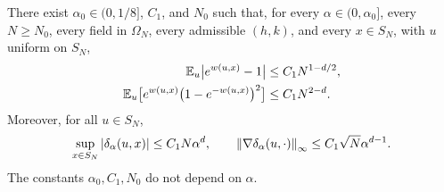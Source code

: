 \begin{proposition}\label{prop:ent-multipliers}
There exist $\alpha_0\in(0,1/8]$, $C_1$, and $N_0$ such that, for every
$\alpha\in(0,\alpha_0]$, every $N\ge N_0$, every field in $\Omega_N$, every
admissible $(h,k)$, and every $x\in S_N$, with $u$ uniform on $S_N$,
\begin{align}
 \mathbb E_u\bigl|e^{w(u,x)}-1\bigr|&\le C_1N^{1-d/2},
 \label{eq:ent-eta}\\
 \mathbb E_u\bigl[e^{w(u,x)}\bigl(1-e^{-w(u,x)}\bigr)^2\bigr]&\le C_1N^{2-d}.
 \label{eq:ent-epsilon}
\end{align}
Moreover, for all $u\in S_N$,
\begin{equation}\label{eq:ent-cutoff-sup}
 \sup_{x\in S_N}|\delta_\alpha(u,x)|\le C_1N\alpha^d,
 \qquad
 \left\lVert\nabla\delta_\alpha(u,\cdot)\right\rVert_\infty\le C_1\sqrt N\alpha^{d-1}.
\end{equation}
The constants $\alpha_0,C_1,N_0$ do not depend on $\alpha$.
\end{proposition}


